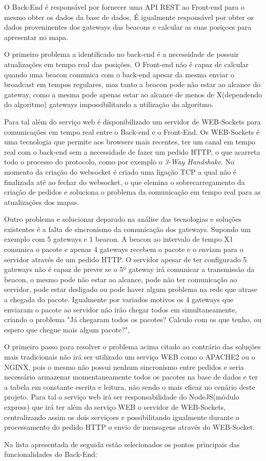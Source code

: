\par O Back-End é responsável por fornecer uma API REST ao Front-end para o mesmo obter os dados da base de dados. É igualmente responsável por obter os dados proveninentes dos gateways das beacons e calcular as suas posiçoes para apresentar no mapa. 
\par O primeiro problema a identificado no back-end é a necessidade de possuir atualizações em tempo real das posições. O Front-end não é capaz de calcular quando uma beacon comunica com o back-end apesar da mesma enviar o broadcast em tempos regulares, mas tanto a beacon  pode não estar ao alcance do gateway, como a mesma pode apenas estar ao alcance de menos de X(dependendo do algoritmo) gateways impossibilitando a utilização do algoritmo. 
\par Para tal além do serviço web é disponibilizado um servidor de WEB-Sockets para comunicações em tempo real entre o Back-end e o Front-End. Os WEB-Sockets é uma tecnologia que permite aos browsers mais recentes, ter um canal em tempo real com o back-end sem a necessidade de fazer um pedido HTTP, o que acarreta todo o processo do protocolo, como por exemplo o \textit{3-Way Handshake}. No momento da criação do websocket é criado uma ligação TCP a qual não é finalizada até ao fechar do websocket, o que elemina o sobrecarregamento da criação de pedidos e soluciona o problema da comunicação em tempo real para as atualizações dos mapas.
\par Outro problema e solucionar deparado na análise das tecnologias e soluções existentes é a falta de sincronismo da comunicação dos gateways. Supondo um exemplo com 5 gateways e 1 beacon. A beacon ao intervalo de tempo X1 comunica o pacote e apenas 4 gateways recebem o pacote e o enviam para o servidor através de um pedido HTTP. O servidor apesar de ter configurado 5 gateways não é capaz de prever se o 5º gateway irá comunicar a transmissão da beacon, o mesmo pode não estar ao alcance, pode não ter comunicação ao servidor, pode estar desligado ou pode haver algum problema na rede que atrase a chegada do pacote. Igualmente por variados motivos os 4 gateways que enviaram o pacote ao servidor não irão chegar todos em simultaneamente, criando o problema "Já chegaram todos os pacotes? Calculo com os que tenho, ou espero que chegue mais algum pacote?",
\par O primeiro passo para resolver o problema acima citado ao contrário das soluções mais tradicionais não irá ser utilizado um serviço WEB como o APACHE2 ou o NGINX, pois o mesmo não possui nenhum sincronismo entre pedidos e seria necessário armazenar momentaneamente todos os pacotes na base de dados e ter a tabela em constante escrita e leitura, não sendo o mais eficaz no cenário deste projeto. Para tal o serviço web irá ser responsabilidade do NodeJS(módulo express) que irá ter além do serviço WEB o servidor de WEB-Sockets, centralizando assim os dois serviçoes e possibilitando igualmente durante o processamento do pedido HTTP o envio de mensagens através do WEB-Socket. 
\par Na lista apresentada de seguida estão selecionados os pontos principais das funcionalidades do Back-End:

